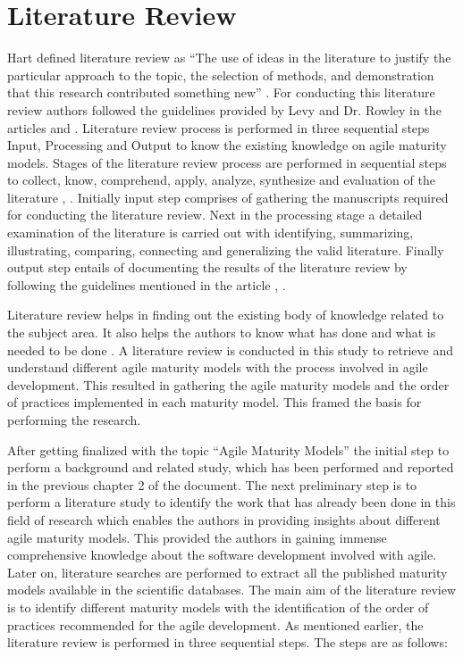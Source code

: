 \documentclass[a4paper,oneside]{bth}
\begin{document}
\section{Literature Review}
\noindent 
Hart defined literature review as “The use of ideas in the literature to justify the particular approach to the topic, the selection of methods, and demonstration that this research contributed something new” \cite{levy_systems_2006}. For conducting this literature review authors followed the guidelines provided by Levy and Dr. Rowley in the articles \cite{levy_systems_2006} and \cite{rowley_conducting_2004}. Literature review process is performed in three sequential steps Input, Processing and Output to know the existing knowledge on agile maturity models. Stages of the literature review process are performed in sequential steps to collect, know, comprehend, apply, analyze, synthesize and evaluation of the literature \cite{levy_systems_2006}, \cite{levy_towards_2006}. Initially input step comprises of gathering the manuscripts required for conducting the literature review. Next in the processing stage a detailed examination of the literature is carried out with identifying, summarizing, illustrating, comparing, connecting and generalizing the valid literature. Finally output step entails of documenting the results of the literature review by following the guidelines mentioned in the article  \cite{levy_systems_2006}, \cite{levy_towards_2006}. 

Literature review helps in finding out the existing body of knowledge related to the subject area. It also helps the authors to know what has done and what is needed to be done \cite{levy_systems_2006}. A literature review is conducted in this study to retrieve and understand different agile maturity models with the process involved in agile development. This resulted in gathering the agile maturity models and the order of practices implemented in each maturity model. This framed the basis for performing the research.

After getting finalized with the topic “Agile Maturity Models” the initial step to perform a background and related study, which has been performed and reported in the previous chapter 2 of the document. The next preliminary step is to perform a literature study to identify the work that has already been done in this field of research which enables the authors in providing insights about different agile maturity models. This provided the authors in gaining immense comprehensive knowledge about the software development involved with agile. Later on, literature searches are performed to extract all the published maturity models available in the scientific databases. The main aim of the literature review is to identify different maturity models with the identification of the order of practices recommended for the agile development. As mentioned earlier, the literature review is performed in three sequential steps. The steps are as follows:
\end{document}
